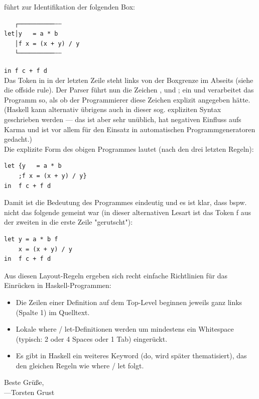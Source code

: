 \documentclass{article}
\newcommand{\Haskell}[1]{\texttt{#1}}
\begin{document}
\begin{mdframed}
führt zur Identifikation der folgenden Box:
\begin{verbatim}
   ┌──────────┄┄     
let│y   = a * b      
   │f x = (x + y) / y
   └──────────┄┄     
\end{verbatim}
\Haskell{in  f c + f d}\\  
Das Token in in der letzten Zeile steht links von der Boxgrenze im Abseits (siehe die offside rule).  Der Parser führt nun die Zeichen {, } und ; ein und verarbeitet das Programm so, als ob der Programmierer diese Zeichen explizit angegeben hätte.  (Haskell kann alternativ übrigens auch in dieser sog. expliziten Syntax geschrieben werden — das ist aber sehr unüblich, hat negativen Einfluss aufs Karma und ist vor allem für den Einsatz in automatischen Programmgeneratoren gedacht.)\\
Die explizite Form des obigen Programmes lautet (nach den drei letzten Regeln):
\begin{verbatim}
let {y   = a * b       
    ;f x = (x + y) / y}
in  f c + f d 
\end{verbatim}     
Damit ist die Bedeutung des Programmes eindeutig und es ist klar, dass bspw. nicht das folgende gemeint war (in dieser alternativen Lesart ist das Token f aus der zweiten in die erste Zeile "gerutscht"):
\begin{verbatim}
let y = a * b f    
    x = (x + y) / y
in  f c + f d   
\end{verbatim}
Aus diesen Layout-Regeln ergeben sich recht einfache Richtlinien für das Einrücken in Haskell-Programmen:
\begin{itemize}
\item Die Zeilen einer Definition auf dem Top-Level beginnen jeweils ganz links (Spalte 1) im Quelltext.
\item Lokale where / let-Definitionen werden um mindestens ein Whitespace (typisch: 2 oder 4 Spaces oder 1 Tab) eingerückt.
\item Es gibt in Haskell ein weiteres Keyword (do, wird später thematisiert), das den gleichen Regeln wie where / let folgt.
\end{itemize}
Beste Grüße,\\
\phantom{ }\qquad —Torsten Grust
\end{mdframed}
\end{document}
